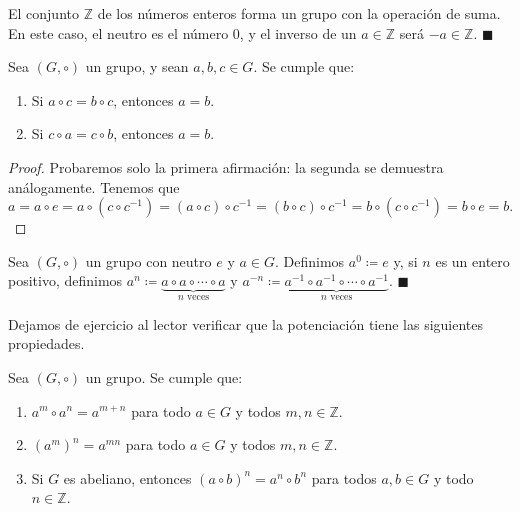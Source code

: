 \begin{example} \label{ejemplo_Z}
El conjunto $\mathbb{Z}$ de los números enteros forma un grupo con la operación de suma. En este caso, el neutro es el número $0$, y el inverso de un $a \in \mathbb{Z}$ será $-a \in \mathbb{Z}$. \hfill$\blacksquare$
\end{example}

\begin{proposition} \label{cancelacion_grupos}
	Sea $(G, \circ)$ un grupo, y sean $a, b, c \in G$. Se cumple que:
	\begin{enumerate}
		\item Si $a \circ c = b \circ c$, entonces $a = b$.
		\item Si $c \circ a = c \circ b$, entonces $a = b$.
	\end{enumerate}
\end{proposition}

\begin{proof}
Probaremos solo la primera afirmación: la segunda se demuestra análogamente. Tenemos que
$$a = a \circ e = a \circ \left( c \circ c^{-1} \right) = \left(a \circ c \right) \circ c^{-1} = \left(b \circ c \right) \circ c^{-1} = b \circ \left( c \circ c^{-1} \right) = b \circ e = b.$$
\end{proof}

\begin{definition}
Sea $(G, \circ)$ un grupo con neutro $e$ y $a \in G$. Definimos $a^0 \coloneqq e$ y, si $n$ es un entero positivo, definimos $a^n \coloneqq \underbrace{a \circ a \circ \cdots \circ a}_{n \text{ veces}}$ y $a^{-n} \coloneqq \underbrace{a^{-1} \circ a^{-1} \circ \cdots \circ a^{-1}}_{n \text{ veces}}$. \hfill$\blacksquare$
\end{definition}

Dejamos de ejercicio al lector verificar que la potenciación tiene las siguientes propiedades.

\begin{prop} Sea $(G, \circ)$ un grupo. Se cumple que:
	\begin{enumerate}
		\item $a^m \circ a^n = a^{m+n}$ para todo $a \in G$ y todos $m, n \in \mathbb{Z}$.
		\item $\left( a^m \right)^n = a^{mn}$ para todo $a \in G$ y todos $m, n \in \mathbb{Z}$.
		\item Si $G$ es abeliano, entonces $\left( a \circ b \right)^{n} = a^n \circ b^n$ para todos $a, b \in G$ y todo $n \in \mathbb{Z}$.
	\end{enumerate}
\end{prop}


